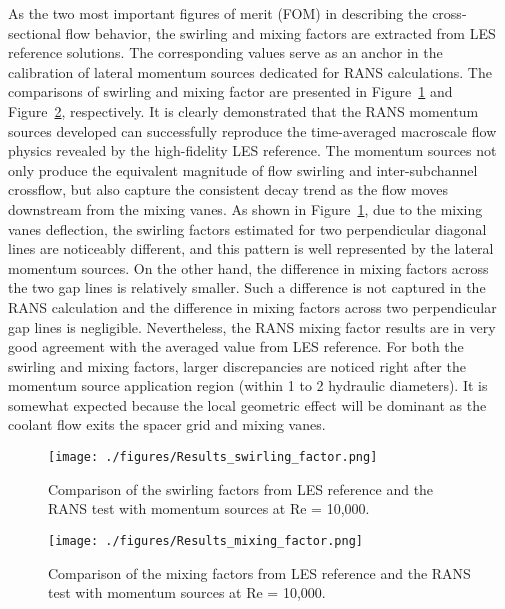 As the two most important figures of merit (FOM) in describing the cross-sectional flow behavior, the swirling and mixing factors are extracted from LES reference solutions.
The corresponding values serve as an anchor in the calibration of lateral momentum sources dedicated for RANS calculations.
The comparisons of swirling and mixing factor are presented in Figure~\ref{fig:fswirl} and Figure~\ref{fig:fmix}, respectively.
It is clearly demonstrated that the RANS momentum sources developed can successfully reproduce the time-averaged macroscale flow physics revealed by the high-fidelity LES reference.
The momentum sources not only produce the equivalent magnitude of flow swirling and inter-subchannel crossflow, but also capture the consistent decay trend as the flow moves downstream from the mixing vanes.
As shown in Figure~\ref{fig:fswirl}, due to the mixing vanes deflection, the swirling factors estimated for two perpendicular diagonal lines are noticeably different, and this pattern is well represented by the lateral momentum sources.
On the other hand, the difference in mixing factors across the two gap lines is relatively smaller. Such a difference is not captured in the RANS calculation and the difference in mixing factors across two perpendicular gap lines is negligible.
Nevertheless, the RANS mixing factor results are in very good agreement with the averaged value from LES reference. 
For both the swirling and mixing factors, larger discrepancies are noticed right after the momentum source application region (within 1 to 2 hydraulic diameters). It is somewhat expected because the local geometric effect will be dominant as the coolant flow exits the spacer grid and mixing vanes. 

\begin{figure}[!ht]
\centering
\texttt{[image: ./figures/Results\_swirling\_factor.png]}
\caption{Comparison of the swirling factors from LES reference and the RANS test with momentum sources at Re = 10,000. }
\label{fig:fswirl}
\end{figure}

\begin{figure}[!ht]
\centering
\texttt{[image: ./figures/Results\_mixing\_factor.png]}
\caption{Comparison of the mixing factors from LES reference and the RANS test with momentum sources at Re = 10,000. }
\label{fig:fmix}
\end{figure}

